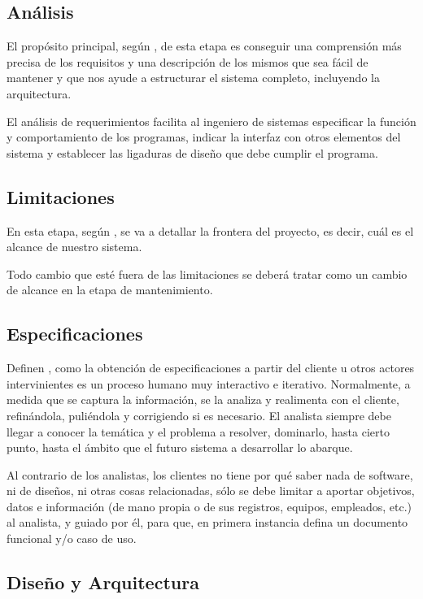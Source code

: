 \documentclass[12pt]{article}
\begin{document}
	\subsection{Análisis}

	El propósito principal, según \textcite{maida_metodologias_2015}, de esta etapa es conseguir una comprensión más precisa de los requisitos y una descripción de los mismos que sea fácil de mantener y que nos ayude a estructurar el sistema completo, incluyendo la arquitectura.

	El análisis de requerimientos facilita al ingeniero de sistemas especificar la función y comportamiento de los programas, indicar la interfaz con otros elementos del sistema y establecer las ligaduras de diseño que debe cumplir el programa.

	\subsection{Limitaciones}

	En esta etapa, según \textcite{maida_metodologias_2015}, se va a detallar la frontera del proyecto, es decir, cuál es el alcance de nuestro
	sistema.

	Todo cambio que esté fuera de las limitaciones se deberá tratar como un cambio de alcance en la
	etapa de mantenimiento.

	\subsection{Especificaciones}

	Definen \textcite{maida_metodologias_2015}, como la obtención de especificaciones a partir del cliente u otros actores intervinientes es un proceso humano muy interactivo e iterativo. Normalmente, a medida que se captura la información, se la analiza y realimenta con el cliente, refinándola, puliéndola y corrigiendo si es necesario. El analista siempre debe llegar a conocer la temática y el problema a resolver, dominarlo, hasta cierto punto, hasta el ámbito que el futuro sistema a desarrollar lo abarque.

	Al contrario de los analistas, los clientes no tiene por qué saber nada de software, ni de diseños, ni otras cosas relacionadas, sólo se debe limitar a aportar objetivos, datos e información (de mano propia	o de sus registros, equipos, empleados, etc.) al analista, y guiado por él, para que, en primera instancia defina un documento funcional y/o caso de uso.

	\subsection{Diseño y Arquitectura}
\end{document}
